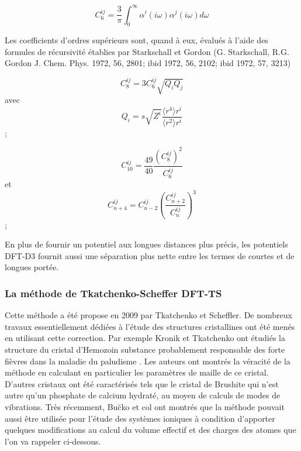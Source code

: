 \bigskip
\begin{equation}
C_{6}^{ij} = \frac{3}{\pi}\int_{0}^{\infty} \alpha^{i} (i\omega) \alpha^{j} (i\omega) d\omega
\end{equation}
\bigskip

Les coefficients d’ordres supérieurs sont, quand à eux, évalués à l’aide des formules de récursivité établies par Starkschall et Gordon (G. Starkschall, R.G. Gordon J. Chem. Phys. 1972, 56, 2801; ibid 1972, 56, 2102; ibid 1972, 57, 3213)

\begin{multicols}
\begin{equation}{C}_{8}^{ij} = 3{C}_{6}^{ij}\sqrt {{Q}_{i}{Q}_{j}}\end{equation} avec
\begin{equation}Q_{i} = s\sqrt{Z^{i}} \frac{\langle r^{4}\rangle r^{i}}{\langle r^{2}\rangle r^{i}}\end{equation}; 
\end{multicols}

\begin{multicols}
\begin{equation} {C}_{10}^{ij}=\frac {49}{40} \frac{{\left({C}_{8}^{ij} \right)}^{2}}{{C}_{6}^{ij}} \end{equation} et
\begin{equation} {C}_{n+4}^{ij}={C}_{n-2}^{ij}{\left(\frac{ {C}_{n+2}^{ij} }{ {C}_{n}^{ij} }\right)}^{3} \end{equation}; 
\end{multicols}

En plus de fournir un potentiel aux longues distances plus précis, les potentiels DFT-D3 fournit aussi une séparation plus nette entre les termes de courtes et de longues portée. 


\subsubsection{La méthode de Tkatchenko-Scheffer DFT-TS}

Cette méthode a été propose en 2009 par Tkatchenko et Scheffler\cite{tkatchenko2009accurate}. De nombreux travaux essentiellement dédiées à l’étude des structures cristallines ont été menés en utilisant cette correction. Par exemple Kronik et Tkatchenko\cite{kronik2014understanding} ont étudiés la structure du cristal d'Hemozoin substance probablement responsable des forte fièvres dans la maladie du paludisme . Les auteurs ont montrés la véracité de la méthode en calculant en particulier les paramètres de maille de ce cristal.  D’autres cristaux ont été caractérisés tels que le cristal de Brushite qui n’est autre qu’un phosphate de calcium hydraté, au moyen de calculs de modes de vibrations. Très récemment, Bu\u{c}ko et col\cite{buvcko2014extending} ont montrés que la méthode pouvait aussi être utilisée pour l’étude des systèmes ioniques à condition d’apporter quelques modifications au calcul du volume effectif et des charges des atomes que l’on va rappeler ci-dessous.
	

